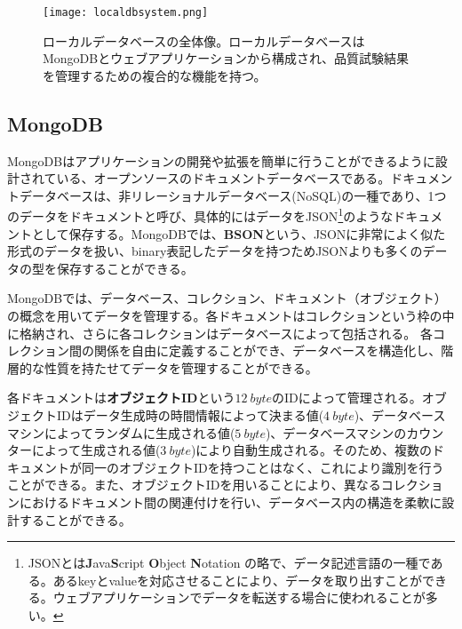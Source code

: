 \begin{figure}[tbp]
  \centering
  \texttt{[image: localdbsystem.png]}
  \caption[ローカルデータベースの全体像]{ローカルデータベースの全体像。ローカルデータベースはMongoDBとウェブアプリケーションから構成され、品質試験結果を管理するための複合的な機能を持つ。}
  \label{fig:localdbsystem}
\end{figure}

\subsection{MongoDB\cite{mongo}}
\label{sec:mongo}

MongoDBはアプリケーションの開発や拡張を簡単に行うことができるように設計されている、オープンソースのドキュメントデータベースである。ドキュメントデータベースは、非リレーショナルデータベース(NoSQL)の一種であり、1つのデータをドキュメントと呼び、具体的にはデータをJSON\footnote{JSONとは\textbf{J}ava\textbf{S}cript \textbf{O}bject \textbf{N}otation の略で、データ記述言語の一種である。あるkeyとvalueを対応させることにより、データを取り出すことができる。ウェブアプリケーションでデータを転送する場合に使われることが多い。}のようなドキュメントとして保存する。MongoDBでは、\textbf{BSON}という、JSONに非常によく似た形式のデータを扱い、binary表記したデータを持つためJSONよりも多くのデータの型を保存することができる。

MongoDBでは、データベース、コレクション、ドキュメント（オブジェクト）の概念を用いてデータを管理する。各ドキュメントはコレクションという枠の中に格納され、さらに各コレクションはデータベースによって包括される。
各コレクション間の関係を自由に定義することができ、データベースを構造化し、階層的な性質を持たせてデータを管理することができる。


各ドキュメントは\textbf{オブジェクトID}という$12\ \si{byte}$のIDによって管理される。オブジェクトIDはデータ生成時の時間情報によって決まる値($4\ \si{byte}$)、データベースマシンによってランダムに生成される値($5\ \si{byte}$)、データベースマシンのカウンターによって生成される値($3\ \si{byte}$)により自動生成される。そのため、複数のドキュメントが同一のオブジェクトIDを持つことはなく、これにより識別を行うことができる。また、オブジェクトIDを用いることにより、異なるコレクションにおけるドキュメント間の関連付けを行い、データベース内の構造を柔軟に設計することができる。

